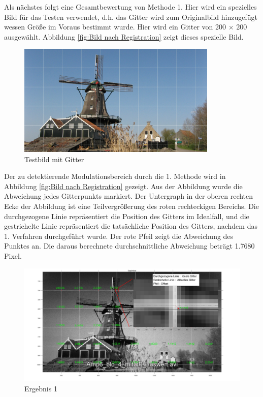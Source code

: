 Als nächstes folgt eine Gesamtbewertung von Methode 1. Hier wird ein spezielles Bild für das Testen verwendet, d.h. das Gitter wird zum Originalbild hinzugefügt wessen Größe im Voraus bestimmt wurde. Hier wird ein Gitter von 200 × 200 ausgewählt. Abbildung \ref{fig:Bild nach Registration} zeigt dieses spezielle Bild.
\begin{figure}[H]
 \centering 
  \includegraphics[keepaspectratio,width=0.85\textwidth]{images/6_Auswertung/windmill_auswert.pdf}
 \caption{Testbild mit Gitter}
 \label{fig:GitterBild}
\end{figure}

Der zu detektierende Modulationsbereich durch die 1. Methode wird in Abbildung \ref{fig:Bild nach Registration} gezeigt. Aus der Abbildung wurde die Abweichung jedes Gitterpunkts markiert. Der Untergraph in der oberen rechten Ecke der Abbildung ist eine Teilvergrößerung des roten rechteckigen Bereichs. Die durchgezogene Linie repräsentiert die Position des Gitters im Idealfall, und die gestrichelte Linie repräsentiert die tatsächliche Position des Gitters, nachdem das 1. Verfahren durchgeführt wurde. Der rote Pfeil zeigt die Abweichung des Punktes an. Die daraus berechnete durchschnittliche Abweichung beträgt 1.7680 Pixel. 

\begin{figure}[H]
 \centering 
  \includegraphics[keepaspectratio,width=1.00\textwidth]{images/6_Auswertung/Ergebnis1.pdf}
 \caption{Ergebnis 1}
 \label{fig:Ergebnis1}
\end{figure}


